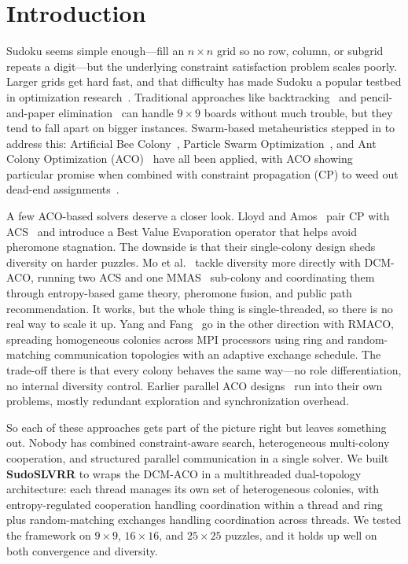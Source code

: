 \section{Introduction}
Sudoku seems simple enough---fill an $n \times n$ grid so no row, column, or subgrid repeats a digit---but the underlying constraint satisfaction problem scales poorly. Larger grids get hard fast, and that difficulty has made Sudoku a popular testbed in optimization research~\cite{lloyd2020,simonis2005sudoku,manyam2024,SSAS}. Traditional approaches like backtracking~\cite{norvig2006solving,Schott,bhattarai2025study,is2012techniques} and pencil-and-paper elimination~\cite{crook2009pencil,bhattarai2025study} can handle $9 \times 9$ boards without much trouble, but they tend to fall apart on bigger instances. Swarm-based metaheuristics stepped in to address this: Artificial Bee Colony~\cite{pacurib2009}, Particle Swarm Optimization~\cite{PSO,GPSO}, and Ant Colony Optimization (ACO)~\cite{lloyd2020} have all been applied, with ACO showing particular promise when combined with constraint propagation (CP) to weed out dead-end assignments~\cite{norvig2006solving,lloyd2020}.

A few ACO-based solvers deserve a closer look. Lloyd and Amos~\cite{lloyd2020} pair CP with ACS~\cite{dorigo2004ant} and introduce a Best Value Evaporation operator that helps avoid pheromone stagnation. The downside is that their single-colony design sheds diversity on harder puzzles. Mo et al.~\cite{mo2022} tackle diversity more directly with DCM-ACO, running two ACS and one MMAS~\cite{dorigo2004ant} sub-colony and coordinating them through entropy-based game theory, pheromone fusion, and public path recommendation. It works, but the whole thing is single-threaded, so there is no real way to scale it up. Yang and Fang~\cite{yang2015} go in the other direction with RMACO, spreading homogeneous colonies across MPI processors using ring and random-matching communication topologies with an adaptive exchange schedule. The trade-off there is that every colony behaves the same way---no role differentiation, no internal diversity control. Earlier parallel ACO designs~\cite{randall2002} run into their own problems, mostly redundant exploration and synchronization overhead.

So each of these approaches gets part of the picture right but leaves something out. Nobody has combined constraint-aware search, heterogeneous multi-colony cooperation, and structured parallel communication in a single solver. We built \textbf{SudoSLVRR} to wraps the DCM-ACO in a multithreaded dual-topology architecture: each thread manages its own set of heterogeneous colonies, with entropy-regulated cooperation handling coordination within a thread and ring plus random-matching exchanges handling coordination across threads. We tested the framework on $9 \times 9$, $16 \times 16$, and $25 \times 25$ puzzles, and it holds up well on both convergence and diversity.